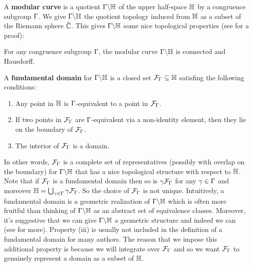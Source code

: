       A \textbf{modular curve} is a quotient $\Gamma\backslash\mathbb{H}$ of the upper half-space $\mathbb{H}$ by a congruence subgroup $\Gamma$. We give $\Gamma\backslash\mathbb{H}$ the quotient topology induced from $\mathbb{H}$ as a subset of the Riemann sphere $\hat{\mathbb{C}}$. This gives $\Gamma\backslash\mathbb{H}$ some nice topological properties (see \cite{diamond2005first} for a proof):
      
      \begin{proposition}\label{prop:modular_curves_topological_properties}
        For any congruence subgroup $\Gamma$, the modular curve $\Gamma\backslash\mathbb{H}$ is connected and Hausdorff.
      \end{proposition}

      A \textbf{fundamental domain} for $\Gamma\backslash\mathbb{H}$ is a closed set $\mathcal{F}_{\Gamma} \subseteq \mathbb{H}$ satisfing the following conditions:
      \begin{enumerate}[label=(\roman*)]
        \item Any point in $\mathbb{H}$ is $\Gamma$-equivalent to a point in $\mathcal{F}_{\Gamma}$.
        \item If two points in $\mathcal{F}_{\Gamma}$ are $\Gamma$-equivalent via a non-identity element, then they lie on the boundary of $\mathcal{F}_{\Gamma}$.
        \item The interior of $\mathcal{F}_{\Gamma}$ is a domain.
      \end{enumerate}
      In other words, $\mathcal{F}_{\Gamma}$ is a complete set of representatives (possibly with overlap on the boundary) for $\Gamma\backslash\mathbb{H}$ that has a nice topological structure with respect to $\mathbb{H}$. Note that if $\mathcal{F}_{\Gamma}$ is a fundamental domain then so is $\gamma\mathcal{F}_{\Gamma}$ for any $\gamma \in \Gamma$ and moreover $\mathbb{H} = \bigcup_{\gamma \in \Gamma}\gamma\mathcal{F}_{\Gamma}$. So the choice of $\mathcal{F}_{\Gamma}$ is not unique. Intuitively, a fundamental domain is a geometric realization of $\Gamma\backslash\mathbb{H}$ which is often more fruitful than thinking of $\Gamma\backslash\mathbb{H}$ as an abstract set of equivalence classes. Moreover, it's suggestive that we can give $\Gamma\backslash\mathbb{H}$ a geometric structure and indeed we can (see \cite{diamond2005first} for more). Property (iii) is usually not included in the definition of a fundamental domain for many authors. The reason that we impose this additional property is because we will integrate over $\mathcal{F}_{\Gamma}$ and so we want $\mathcal{F}_{\Gamma}$ to genuinely represent a domain as a subset of $\mathbb{H}$.

